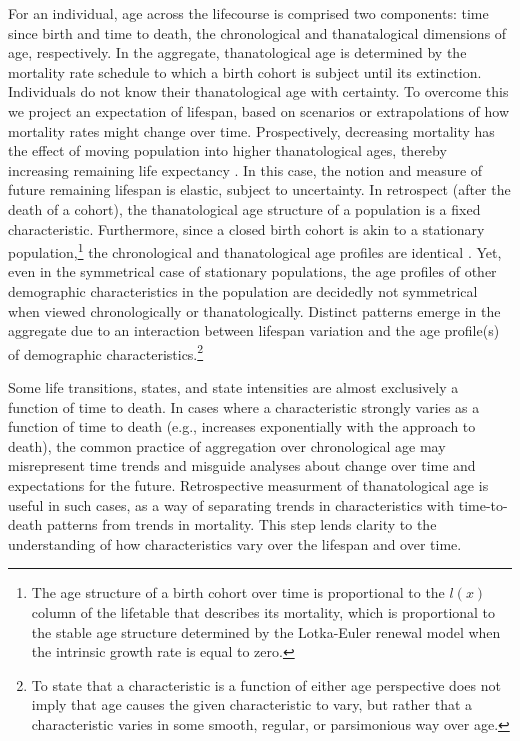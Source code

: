 \documentclass{article}
\begin{document}
For an
individual, age across the lifecourse is comprised two components: time since
birth and time to death, the chronological and thanatalogical dimensions of
age, respectively. In the aggregate, thanatological age is determined
by the mortality rate schedule to which a birth cohort is subject until its
extinction. Individuals do not know their thanatological age with certainty. To
overcome this we project an expectation of lifespan, based on scenarios or extrapolations of how mortality
rates might change over time. Prospectively, decreasing mortality has the effect
of moving population into higher thanatological ages, thereby increasing
remaining life expectancy \citep{sanderson2005average}. In this case,
the notion and measure of future remaining lifespan is elastic, subject to uncertainty.
In retrospect (after the death of a cohort), the thanatological age structure of
a population is a fixed characteristic. Furthermore, since a closed birth cohort
is akin to a stationary population,\footnote{The age structure of a birth cohort over time is proportional to the $l(x)$ column of the lifetable that describes its
mortality, which is proportional to the stable age structure determined by
the Lotka-Euler renewal model when the intrinsic growth rate is equal to zero.}
the chronological and thanatological age profiles are identical
\citep{brouard1989mouvements,vaupel2009life,rao2014generalization}. Yet, even in
the symmetrical case of stationary populations, the age profiles of other
demographic characteristics in the population are decidedly not symmetrical when
viewed chronologically or thanatologically. Distinct patterns emerge in the
aggregate due to an interaction between lifespan variation and the age profile(s) of
demographic characteristics.\footnote{To state that a characteristic is a function of either
age perspective does not imply that age causes the given characteristic to vary,
but rather that a characteristic varies in some smooth, regular, or parsimonious
way over age.}

Some life
transitions, states, and state intensities are almost exclusively a function of
time to death. In cases where a characteristic strongly varies as a function of
time to death (e.g., increases exponentially with the approach to death),
the common practice of aggregation over chronological age may misrepresent time
trends and misguide analyses about change over time and expectations for the
future. Retrospective measurment of thanatological age is useful in such
cases, as a way of separating trends in characteristics with time-to-death
patterns from trends in mortality. This step lends clarity to the understanding
of how characteristics vary over the lifespan and over time.
\end{document}
